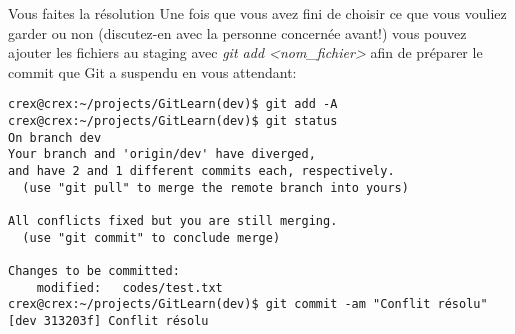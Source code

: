 \documentclass{beamer}
\begin{document}
\begin{frame}[fragile]{Vous faites la résolution}
Une fois que vous avez fini de choisir ce que vous vouliez garder ou non (discutez-en avec la personne concernée avant!) vous pouvez ajouter les fichiers au staging avec \textit{git add <nom\_fichier>} afin de préparer le commit que Git a suspendu en vous attendant:

\begin{mdframed}[style=Bash]
\begin{lstlisting}[style=Bash, caption=Fin de résolution du conflit]
crex@crex:~/projects/GitLearn(dev)$ git add -A
crex@crex:~/projects/GitLearn(dev)$ git status
On branch dev
Your branch and 'origin/dev' have diverged,
and have 2 and 1 different commits each, respectively.
  (use "git pull" to merge the remote branch into yours)

All conflicts fixed but you are still merging.
  (use "git commit" to conclude merge)

Changes to be committed:
	modified:   codes/test.txt
crex@crex:~/projects/GitLearn(dev)$ git commit -am "Conflit résolu"
[dev 313203f] Conflit résolu
\end{lstlisting}
\end{mdframed}
\end{frame}
\end{document}
